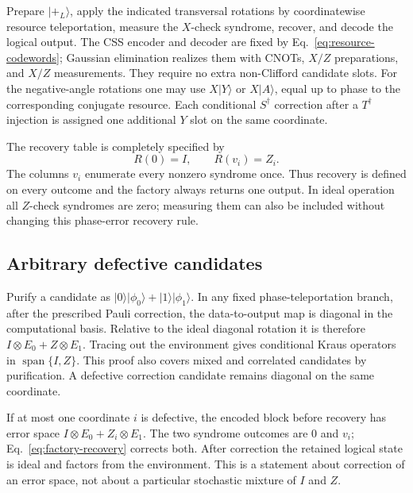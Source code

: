 Prepare $|+_L\rangle$, apply the indicated transversal rotations by
coordinatewise resource teleportation, measure the $X$-check syndrome,
recover, and decode the logical output. The CSS encoder and decoder are
fixed by Eq.~\eqref{eq:resource-codewords}; Gaussian elimination realizes
them with CNOTs, $X/Z$ preparations, and $X/Z$ measurements. They require
no extra non-Clifford candidate slots. For the negative-angle rotations
one may use $X|Y\rangle$ or $X|A\rangle$, equal up to phase to the
corresponding conjugate resource. Each conditional $S^\dagger$ correction
after a $T^\dagger$ injection is assigned one additional $Y$ slot on
the same coordinate.

The recovery table is completely specified by
\begin{equation}
 R(0)=I,\qquad R(v_i)=Z_i.
 \label{eq:factory-recovery}
\end{equation}
The columns $v_i$ enumerate every nonzero syndrome once. Thus recovery
is defined on every outcome and the factory always returns one output.
In ideal operation all $Z$-check syndromes are zero; measuring them can
also be included without changing this phase-error recovery rule.

\subsection{Arbitrary defective candidates}
Purify a candidate as $|0\rangle|\phi_0\rangle+
|1\rangle|\phi_1\rangle$. In any fixed phase-teleportation branch, after
the prescribed Pauli correction, the data-to-output map is diagonal in
the computational basis. Relative to the ideal diagonal rotation it is
therefore $I\otimes E_0+Z\otimes E_1$. Tracing out the environment gives
conditional Kraus operators in $\operatorname{span}\{I,Z\}$. This proof
also covers mixed and correlated candidates by purification. A defective
correction candidate remains diagonal on the same coordinate.

If at most one coordinate $i$ is defective, the encoded block before
recovery has error space
$I\otimes E_0+Z_i\otimes E_1$. The two syndrome outcomes are $0$ and
$v_i$; Eq.~\eqref{eq:factory-recovery} corrects both. After correction
the retained logical state is ideal and factors from the environment.
This is a statement about correction of an error space, not about a
particular stochastic mixture of $I$ and $Z$.

